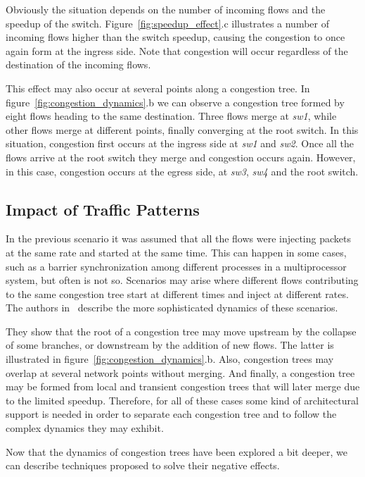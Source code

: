 Obviously the situation depends on the number of incoming flows and the speedup of the switch. Figure~\ref{fig:speedup_effect}.c illustrates a number of incoming flows higher than the switch speedup, causing the congestion to once again form at the ingress side. Note that congestion will occur regardless of the destination of the incoming flows. 

This effect may also occur at several points along a congestion tree. In figure~\ref{fig:congestion_dynamics}.b we can observe a congestion tree formed by eight flows heading to the same destination. Three flows merge at \emph{sw1}, while other flows merge at different points, finally converging at the root switch. In this situation, congestion first occurs at the ingress side at \emph{sw1} and \emph{sw2}. Once all the flows arrive at the root switch they merge and congestion occurs again. However, in this case, congestion occurs at the egress side, at \emph{sw3}, \emph{sw4} and the root switch.

\subsection{Impact of Traffic Patterns}\label{S:traffic_patterns}

In the previous scenario it was assumed that all the flows were injecting packets at the same rate and started at the same time. This can happen in some cases, such as a barrier synchronization among different processes in a multiprocessor system, but often is not so. Scenarios may arise where different flows contributing to the same congestion tree start at different times and inject at different rates. The authors in~\cite{paper1} describe the more sophisticated dynamics of these scenarios.

They show that the root of a congestion tree may move upstream by the collapse of some branches, or downstream by the addition of new flows. The latter is illustrated in figure~\ref{fig:congestion_dynamics}.b. Also, congestion trees may overlap at several network points without merging. And finally, a congestion tree may be formed from local and transient congestion trees that will later merge due to the limited speedup. Therefore, for all of these cases some kind of architectural support is needed in order to separate each congestion tree and to follow the complex dynamics they may exhibit. 

Now that the dynamics of congestion trees have been explored a bit deeper, we can describe techniques proposed to solve their negative effects.

